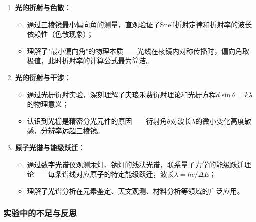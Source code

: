 \documentclass[11pt]{article}
\begin{document}
\begin{enumerate}
    \item \textbf{光的折射与色散}：
    \begin{itemize}
        \item 通过三棱镜最小偏向角的测量，直观验证了Snell折射定律和折射率的波长依赖性（色散现象）；
        \item 理解了"最小偏向角"的物理本质——光线在棱镜内对称传播时，偏向角取极值，此时折射率的计算公式最为简洁。
    \end{itemize}
    
    \item \textbf{光的衍射与干涉}：
    \begin{itemize}
        \item 通过光栅衍射实验，深刻理解了夫琅禾费衍射理论和光栅方程$d\sin\theta = k\lambda$的物理意义；
        \item 认识到光栅是精密分光元件的原因——衍射角$\theta$对波长$\lambda$的微小变化高度敏感，分辨率远超三棱镜。
    \end{itemize}
    
    \item \textbf{原子光谱与能级跃迁}：
    \begin{itemize}
        \item 通过数字光谱仪观测汞灯、钠灯的线状光谱，联系量子力学的能级跃迁理论——每条谱线对应原子的特定能级跃迁，波长$\lambda = hc / \Delta E$；
        \item 理解了光谱分析在元素鉴定、天文观测、材料分析等领域的广泛应用。
    \end{itemize}
\end{enumerate}

\subsubsection{实验中的不足与反思}
\end{document}
